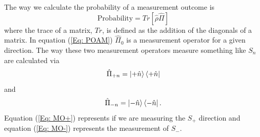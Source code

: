 \documentclass[twocolumn]{article}
\begin{document}
The way we calculate the probability of a measurement outcome is
\begin{equation} \label{Eq: POAM}
\text{Probability}=Tr[\hat{\rho}\hat{\Pi}]
\end{equation}
where the trace of a matrix, $Tr$, is defined as the addition of the diagonals of a matrix. In equation (\ref{Eq: POAM}) $\hat{\Pi}_0$ is a measurement operator for a given direction. The way these two measurement operators measure something like $S_n$ are calculated via
\begin{equation}\label{Eq: MO+}
\hat{\Pi}_{+n}=\ket{+\hat{n}}\bra{+\hat{n}}
\end{equation}
and
\begin{equation}\label{Eq: MO-}
\hat{\Pi}_{-n}=\ket{-\hat{n}}\bra{-\hat{n}}.
\end{equation}
Equation (\ref{Eq: MO+}) represents if we are measuring the $S_+$ direction and equation (\ref{Eq: MO-}) represents the measurement of $S_-$.
\end{document}
